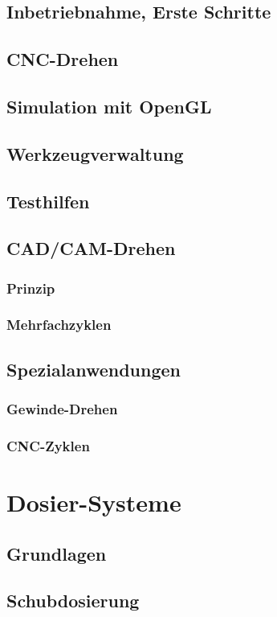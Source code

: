 \documentclass[a4paper]{book}
\begin{document}
	\section{Inbetriebnahme, Erste Schritte} 
	\section{CNC-Drehen} 
	\section{Simulation mit OpenGL} 
	\section{Werkzeugverwaltung} 
	\section{Testhilfen} 
	\section{CAD/CAM-Drehen} 
		\subsection{Prinzip} 
		\subsection{Mehrfachzyklen} 
	\section{Spezialanwendungen} 
		\subsection{Gewinde-Drehen} 
		\subsection{CNC-Zyklen} 
 
\chapter{Dosier-Systeme}
	\section{Grundlagen} 
	\section{Schubdosierung} 
 
\end{document}
